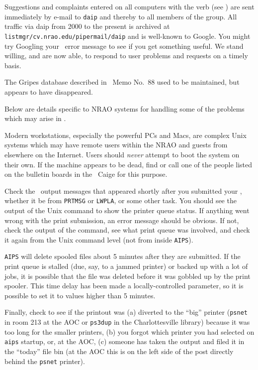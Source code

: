     Suggestions and complaints entered on all computers with the
{\tt {}} verb (see ) are sent immediately by
e-mail to {\tt daip} and thereby to all members of the group.
All traffic via daip from 2000 to the present is archived at {\tt
listmgr/cv.nrao.edu/pipermail/daip} and is well-known to Google.  You
might try Googling your \AIPS\ error message to see if you get
something useful.  We stand willing, and are now able, to respond to
user problems and requests on a timely basis.

The Gripes database described in \AIPS\ Memo No.~88  used to be
maintained, but appears to have disappeared.

\vfill\eject
{}

     Below are details specific to NRAO systems for handling some of
the problems which may arise in
\hbox{\AIPS}.


     Modern workstations, especially the powerful PCs and Macs, are
complex Unix systems which may have remote users within the NRAO and
guests from elsewhere on the Internet.  Users should {\it never\/}
attempt to boot the system on their own.  If the machine appears to be
dead, find or call one of the people listed on the bulletin boards in
the \AIPS\ Caige for this purpose.


     Check the \AIPS\ output messages that appeared shortly after you
submitted your , whether it be from {\tt PRTMSG} or
{\tt LWPLA}, or some other task.  You should see the output of the
Unix command to show the printer queue status.  If anything went wrong
with the print submission, an error message should be obvious.  If
not, check the output of the {\tt {}} command, see what print
queue was involved, and check it again from the Unix command level
(not from inside {\tt AIPS})\@.

     {\tt AIPS} will delete spooled files about 5 minutes after they
are submitted.  If the print queue is stalled (due, say, to a jammed
printer) or backed up with a lot of jobs, it is possible that the file
was deleted before it was gobbled up by the print spooler.  This time
delay has been made a locally-controlled parameter, so it is possible
to set it to values higher than 5 minutes.

     Finally, check to see if the printout was (a) diverted to the
``big'' printer ({\tt psnet} in room 213 at the AOC or {\tt ps3dup} in
the Charlottesville library) because it was too long for the smaller
printers, (b) you forgot which printer you had selected on {\tt aips}
startup, or, at the AOC, (c) someone has taken the output and filed
it in the ``today'' file bin (at the AOC this is on the left side of
the post directly behind the {\tt psnet} printer).

